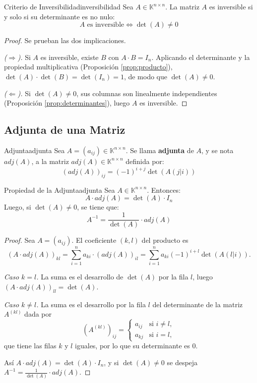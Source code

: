 \documentclass[11pt, a4paper]{article}
\begin{document}
\begin{proposicion}{Criterio de Inversibilidad}{inversibilidad}
Sea $A \in \mathbb{K}^{n \times n}$. La matriz $A$ es inversible si y solo si su determinante es no nulo:
\[
A \text{ es inversible} \iff \det(A) \neq 0
\]
\end{proposicion}

\begin{proof}
Se prueban las dos implicaciones.

\textit{($\Rightarrow$).} Si $A$ es inversible, existe $B$ con $A \cdot B = I_n$. Aplicando el determinante y la propiedad multiplicativa (Proposición \ref{prop:producto}), $\det(A) \cdot \det(B) = \det(I_n) = 1$, de modo que $\det(A) \neq 0$.

\textit{($\Leftarrow$).} Si $\det(A) \neq 0$, sus columnas son linealmente independientes (Proposición \ref{prop:determinantes}), luego $A$ es inversible.
\end{proof}

\subsection{Adjunta de una Matriz}

\begin{definicion}{Adjunta}{adjunta}
Sea $A=(a_{ij}) \in \mathbb{K}^{n \times n}$. Se llama \textbf{adjunta} de $A$, y se nota $adj(A)$, a la matriz $adj(A) \in \mathbb{K}^{n \times n}$ definida por:
\[
(adj(A))_{ij} = (-1)^{i+j} \det(A(j|i))
\]
\end{definicion}

\begin{proposicion}{Propiedad de la Adjunta}{adjunta}
Sea $A \in \mathbb{K}^{n \times n}$. Entonces:
\[ A \cdot adj(A) = \det(A) \cdot I_n \]
Luego, si $\det(A) \neq 0$, se tiene que:
\[ A^{-1} = \frac{1}{\det(A)} \cdot adj(A) \]
\end{proposicion}

\begin{proof}
Sea $A = (a_{ij})$. El coeficiente $(k,l)$ del producto es
\[
(A \cdot adj(A))_{kl} = \sum_{i=1}^{n} a_{ki} \cdot (adj(A))_{il} = \sum_{i=1}^{n} a_{ki} (-1)^{i+l} \det(A(l|i)).
\]

\textit{Caso $k = l$.} La suma es el desarrollo de $\det(A)$ por la fila $l$, luego $(A \cdot adj(A))_{ll} = \det(A)$.

\textit{Caso $k \neq l$.} La suma es el desarrollo por la fila $l$ del determinante de la matriz $A^{(kl)}$ dada por
\[
(A^{(kl)})_{ij} = \begin{cases} a_{ij} & \text{si } i \neq l, \\ a_{kj} & \text{si } i = l, \end{cases}
\]
que tiene las filas $k$ y $l$ iguales, por lo que su determinante es $0$.

Así $A \cdot adj(A) = \det(A) \cdot I_n$, y si $\det(A) \neq 0$ se despeja $A^{-1} = \frac{1}{\det(A)} \cdot adj(A)$.
\end{proof}
\end{document}
